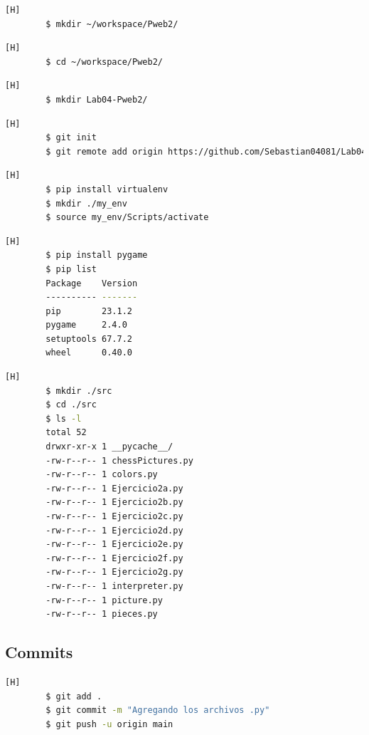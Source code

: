 \documentclass{article}
\begin{document}
	\begin{lstlisting}[language=bash,caption={Creando directorio de trabajo}][H]
		$ mkdir ~/workspace/Pweb2/
	\end{lstlisting}
	\begin{lstlisting}[language=bash,caption={Dirijíéndonos al directorio de trabajo}][H]
		$ cd ~/workspace/Pweb2/
	\end{lstlisting}	
	\begin{lstlisting}[language=bash,caption={Creando directorio para repositorio GitHub}][H]
		$ mkdir Lab04-Pweb2/
	\end{lstlisting}
	\begin{lstlisting}[language=bash,caption={Inicializando directorio para repositorio GitHub}][H]
		$ git init
		$ git remote add origin https://github.com/Sebastian04081/Lab04-Pweb2.git
	\end{lstlisting}
	
	\begin{lstlisting}[language=bash,caption={Inicializando directorio para crear el entorno virtual}][H]
		$ pip install virtualenv
		$ mkdir ./my_env
		$ source my_env/Scripts/activate
	\end{lstlisting}
	
	\begin{lstlisting}[language=bash,caption={Instalando pygame para poder trabajar los ejercicios propuestos}][H]
		$ pip install pygame
		$ pip list
		Package    Version
		---------- -------
		pip        23.1.2
		pygame     2.4.0
		setuptools 67.7.2
		wheel      0.40.0
	\end{lstlisting}
	
	\begin{lstlisting}[language=bash,caption={Inicializando directorio para cargar los archivos .py}][H]
		$ mkdir ./src
		$ cd ./src
		$ ls -l
		total 52
		drwxr-xr-x 1 __pycache__/
		-rw-r--r-- 1 chessPictures.py
		-rw-r--r-- 1 colors.py
		-rw-r--r-- 1 Ejercicio2a.py
		-rw-r--r-- 1 Ejercicio2b.py
		-rw-r--r-- 1 Ejercicio2c.py
		-rw-r--r-- 1 Ejercicio2d.py
		-rw-r--r-- 1 Ejercicio2e.py
		-rw-r--r-- 1 Ejercicio2f.py
		-rw-r--r-- 1 Ejercicio2g.py
		-rw-r--r-- 1 interpreter.py
		-rw-r--r-- 1 picture.py
		-rw-r--r-- 1 pieces.py
	\end{lstlisting}
	
	\subsection{Commits}
	\begin{lstlisting}[language=bash,caption={Primer Commit Creando carpeta/src para los archivos .py}][H]
		$ git add .
		$ git commit -m "Agregando los archivos .py"			
		$ git push -u origin main
	\end{lstlisting}
	
\end{document}
